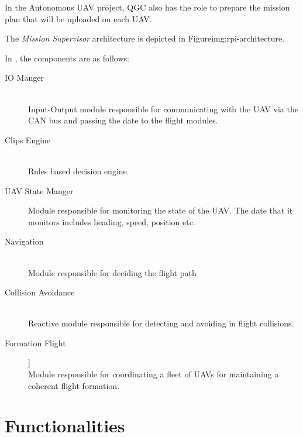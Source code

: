 In the Autonomous UAV project, QGC also has the role to prepare the mission plan
that will be uploaded on each UAV.

The \textit {Mission Supervisor} architecture is depicted in  
{Figure}{img:rpi-architecture}.

\newpage
In , the components are as
follows:
\begin{description}
\item [IO Manger] \hfill \\
Input-Output module responsible for communicating with the UAV via the CAN bus 
and passing the date to the flight modules.
\item [Clips Engine] \hfill \\
Rules based decision engine.
\item [UAV State Manger] Module responsible for monitoring the state of the UAV.
The date that it monitors includes heading, speed,  position etc.
\item [Navigation] \hfill \\
Module responsible for deciding the flight path
\item [Collision Avoidance] \hfill \\
Reactive module responsible for detecting and avoiding in flight collisions.
\item [Formation Flight] ] \hfill \\
Module responsible for coordinating a fleet of UAVs for maintaining a coherent
flight formation.
\end{description}

\section{Functionalities}
\label{sec:functionalities}

